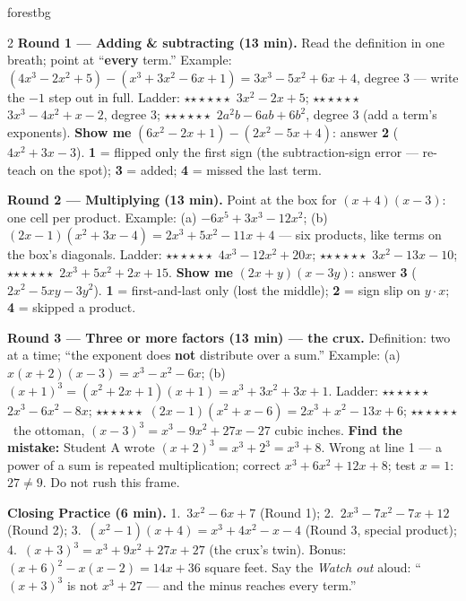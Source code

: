 \documentclass[10pt]{article}
\newcommand{\rung}[1]{{\color{goldacc}\ifcase#1\or$\star$\or$\star\star$\or$\star\star\star$\fi}}
\begin{document}
\begin{skillbox}{forestbg}
\begin{multicols}{2}
\textbf{Round 1 --- Adding \& subtracting (13 min).} Read the definition in one breath; point at
``\textbf{every} term.'' Example: $(4x^3-2x^2+5)-(x^3+3x^2-6x+1)=3x^3-5x^2+6x+4$, degree 3 ---
write the $-1$ step out in full. Ladder: \rung1\ $3x^2-2x+5$; \rung2\ $3x^3-4x^2+x-2$, degree 3;
\rung3\ $2a^2b-6ab+6b^2$, degree 3 (add a term's exponents). \textbf{Show me}
$(6x^2-2x+1)-(2x^2-5x+4)$: answer \textbf{2} ($4x^2+3x-3$). \textbf{1} = flipped only the first
sign (the subtraction-sign error --- re-teach on the spot); \textbf{3} = added; \textbf{4} =
missed the last term.

\textbf{Round 2 --- Multiplying (13 min).} Point at the box for $(x+4)(x-3)$: one cell per
product. Example: (a) $-6x^5+3x^3-12x^2$; (b) $(2x-1)(x^2+3x-4)=2x^3+5x^2-11x+4$ --- six
products, like terms on the box's diagonals. Ladder: \rung1\ $4x^3-12x^2+20x$; \rung2\
$3x^2-13x-10$; \rung3\ $2x^3+5x^2+2x+15$. \textbf{Show me} $(2x+y)(x-3y)$: answer \textbf{3}
($2x^2-5xy-3y^2$). \textbf{1} = first-and-last only (lost the middle); \textbf{2} = sign slip
on $y\cdot x$; \textbf{4} = skipped a product.

\columnbreak
\textbf{Round 3 --- Three or more factors (13 min) --- the crux.} Definition: two at a time;
``the exponent does \textbf{not} distribute over a sum.'' Example: (a)
$x(x+2)(x-3)=x^3-x^2-6x$; (b) $(x+1)^3=(x^2+2x+1)(x+1)=x^3+3x^2+3x+1$. Ladder: \rung1\
$2x^3-6x^2-8x$; \rung2\ $(2x-1)(x^2+x-6)=2x^3+x^2-13x+6$; \rung3\ the ottoman,
$(x-3)^3=x^3-9x^2+27x-27$ cubic inches. \textbf{Find the mistake:} Student A wrote
$(x+2)^3=x^3+2^3=x^3+8$. Wrong at line 1 --- a power of a sum is repeated multiplication;
correct $x^3+6x^2+12x+8$; test $x=1$: $27\ne9$. Do not rush this frame.

\textbf{Closing Practice (6 min).} 1.\ $3x^2-6x+7$ (Round 1); 2.\ $2x^3-7x^2-7x+12$ (Round 2);
3.\ $(x^2-1)(x+4)=x^3+4x^2-x-4$ (Round 3, special product); 4.\ $(x+3)^3=x^3+9x^2+27x+27$ (the
crux's twin). Bonus: $(x+6)^2-x(x-2)=14x+36$ square feet. Say the \emph{Watch out} aloud:
``$(x+3)^3$ is not $x^3+27$ --- and the minus reaches every term.''
\end{multicols}
\end{skillbox}
\end{document}
